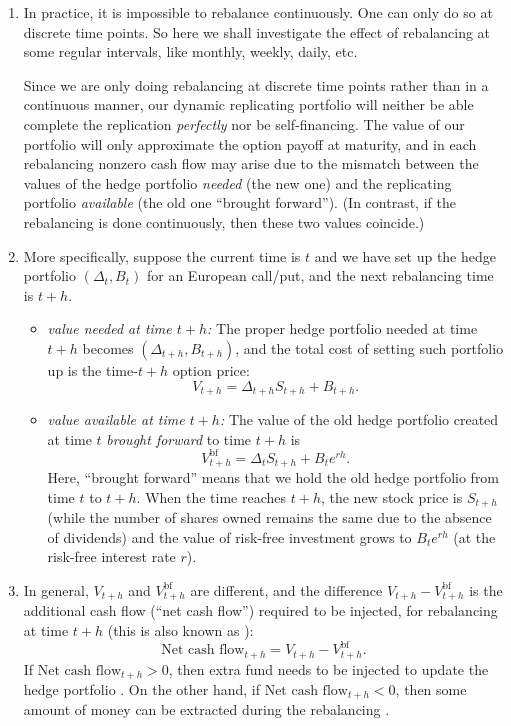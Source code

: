\begin{enumerate}
\item In practice, it is impossible to rebalance continuously. One can only do
so at discrete time points. So here we shall investigate the effect of
rebalancing at some regular intervals, like monthly, weekly, daily, etc.

Since we are only doing rebalancing at discrete time points rather than in a
continuous manner, our dynamic replicating portfolio will neither be able
complete the replication \emph{perfectly} nor be self-financing. The value of
our portfolio will only approximate the option payoff at maturity, and in each
rebalancing nonzero cash flow may arise due to the mismatch between the values
of the hedge portfolio \emph{needed} (the new one) and the replicating
portfolio \emph{available} (the old one ``brought forward''). (In contrast, if
the rebalancing is done continuously, then these two values coincide.)

\item \label{it:dyna-hedge-port-val-need-avail-fmlas}
More specifically, suppose the current time is \(t\) and we have set up
the hedge portfolio \((\Delta_t,B_t)\) for an European call/put, and the next
rebalancing time is \(t+h\).
\begin{itemize}
\item \emph{value needed at time \(t+h\):} The proper hedge portfolio needed at
time \(t+h\) becomes \((\Delta_{t+h},B_{t+h})\), and the total cost of setting
such portfolio up is the time-\(t+h\) option price:
\[
V_{t+h}=\boxed{\Delta_{t+h}S_{t+h}+B_{t+h}}.
\]
\item \emph{value available at time \(t+h\):} The value of the old hedge
portfolio created at time \(t\) \emph{brought forward} to time \(t+h\) is
\[
V_{t+h}^{\mathrm{bf}}=\boxed{\Delta_tS_{t+h}+B_te^{rh}}.
\]
Here, ``brought forward'' means that we hold the old hedge portfolio from time
\(t\) to \(t+h\). When the time reaches \(t+h\), the new stock price is
\(S_{t+h}\) (while the number of shares owned remains the same due to the
absence of dividends) and the value of risk-free investment grows to
\(B_te^{rh}\) (at the risk-free interest rate \(r\)).
\end{itemize}

\item \label{it:dyna-hedge-ncf-fmla}
In general, \(V_{t+h}\) and \(V_{t+h}^{\mathrm{bf}}\) are different, and the
difference \(V_{t+h}-V_{t+h}^{\mathrm{bf}}\) is the additional cash flow (``net
cash flow'') required to be injected, for rebalancing at time \(t+h\) (this is
also known as ):
\[
\text{Net cash flow}_{t+h}=V_{t+h}-V_{t+h}^{\mathrm{bf}}.
\]
If \(\text{Net cash flow}_{t+h}>0\), then extra fund needs to be injected to
update the hedge portfolio . On the other hand, if \(\text{Net
cash flow}_{t+h}<0\), then some amount of money can be extracted during the
rebalancing .


\end{enumerate}
